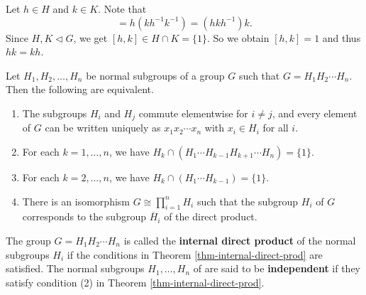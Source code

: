 \begin{sketch}
	Let $h \in H$ and $k \in K$. Note that
	\begin{equation*}
		[h,k] = h(kh^{-1}k^{-1}) = (hkh^{-1})k. 
	\end{equation*} Since $H,K \lhd G$, we get $[h,k]\in  H \cap K = \{1\}$. So we obtain $[h,k] = 1$ and thus $hk = kh$.
\end{sketch}
\begin{theorem} \label{thm-internal-direct-prod}
	Let $H_1, H_2, \ldots, H_n$ be normal subgroups of a group $G$ such that $G = H_1 H_2 \cdots H_n$. Then the following  are equivalent.
	\begin{enumerate}[(1)]
		\item The subgroups $H_i$ and $H_j$ commute elementwise for $i\neq j$, and every element of $G$ can be written uniquely as $ x_1 x_2 \cdots x_n$ with $x_i\in H_i$ for all $i$.
		\item For each $k=1,\dots, n$, we have $H_k \cap (H_1\cdots H_{k-1}H_{k+1}\cdots H_n )= \{1\}$.
		\item For each $k = 2, \ldots, n$, we have $H_k \cap (H_1\cdots H_{k-1})  = \{1\}$.
		\item There is an isomorphism $G \cong \prod_{i=1}^n H_i$ such that the subgroup $H_i$ of $G$ corresponds to the subgroup $\overline{H}_i$ of the direct product.
	\end{enumerate}
\end{theorem}
\begin{definition}
	The group $G = H_1 H_2 \cdots H_n$ is called the \textbf{internal direct product} of the normal subgroups $H_i$ if the conditions in Theorem \ref{thm-internal-direct-prod} are satisfied.
	The normal subgroups $H_1,\dots, H_n$ of are said to be \textbf{independent} if they satisfy condition (2) in Theorem \ref{thm-internal-direct-prod}. 
\end{definition}
